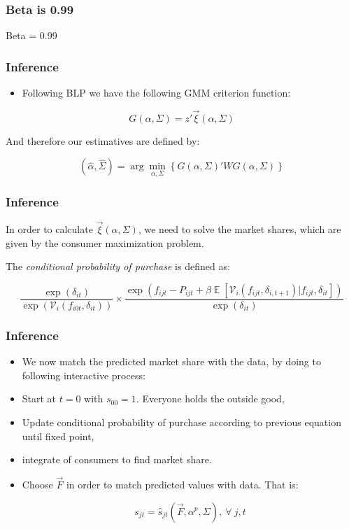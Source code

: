 \documentclass{beamer}
\theoremstyle{definition}
\begin{document}
\begin{frame}
  \frametitle{Beta is 0.99}

  {\huge Beta = 0.99}

\end{frame}

\begin{frame}
  \frametitle{Inference}

  \begin{itemize}
    \item Following BLP we have the following GMM criterion function:
  \end{itemize}

  \[
    G(\alpha, \Sigma) = z' \vec{\xi}(\alpha, \Sigma)
  \]

  And therefore our estimatives are defined by:

  \[
    \left( \hat{\alpha}, \hat{\Sigma} \right) = \arg\min_{\alpha, \Sigma}
    \left\{ G(\alpha, \Sigma)'WG(\alpha, \Sigma)\right\}
  \]
\end{frame}

\begin{frame}
  \frametitle{Inference}

  In order to calculate $\vec{\xi}(\alpha, \Sigma)$, we need to solve the
  market shares, which are given by the consumer maximization problem.

  The \textit{conditional probability of purchase} is defined as:

  \[
    \frac{\exp (\delta_{it})}{\exp (\mathcal{V}_i(f_{i0t}, \delta_{it}))}
    \times
    \frac{ \exp (f_{ijt} - P_{ijt} + \beta
      \mathop{\mathbb{E}} [\mathcal{V}_i(f_{ijt}, \delta_{i, t+1})|
        f_{ijt}, \delta_{it}])}
      { \exp(\delta_{it}) }
  \]
\end{frame}

\begin{frame}
  \frametitle{Inference}

  \begin{itemize}
    \item We now match the predicted market share with the data, by doing to following
      interactive process:
    \item Start at $t = 0$ with $s_{00} = 1$. Everyone holds the outside good,
    \item Update conditional probability of purchase according to previous
      equation until fixed point,
    \item integrate of consumers to find market share.
    \item Choose $\vec{F}$ in order to match predicted values with data. That is:

      \[
        s_{jt} = \hat{s}_{{jt}}\left(\vec{F}, \alpha^p, \Sigma\right),\ \forall\ j,t
      \]
  \end{itemize} 
\end{frame}
\end{document}
